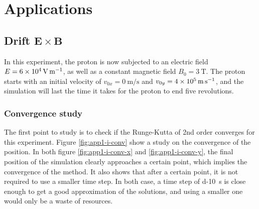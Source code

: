 \documentclass[a4paper,12pt,twoside]{article}
\begin{document}
\section{Applications}
\subsection{Drift $\mathbf{E}\times \mathbf{B}$}
In this experiment, the proton is now subjected to an electric field $E=\SI{6d4}{\volt\per\meter}$, as well as a constant magnetic field $B_0 = \SI{3}{\tesla}$.
The proton starts with an initial velocity of $v_{0x}=\SI{0}{\meter\per\second}$ and $v_{0y}=\SI{4d5}{\meter\per\second}$, and the simulation will last the time it takes for the proton to end five revolutions.

\subsubsection{Convergence study}
The first point to study is to check if the Runge-Kutta of 2nd order converges for this experiment.
Figure \ref{fig:app1-i-conv} show a study on the convergence of the position.
In both figure \ref{fig:app1-i-conv-x} and \ref{fig:app1-i-conv-y}, the final position of the simulation clearly approaches a certain point, which implies the convergence of the method.
It also shows that after a certain point, it is not required to use a smaller time step.
In both case, a time step of \SI{d-10}{\second} is close enough to get a good approximation of the solutions, and using a smaller one would only be a waste of resources.
\end{document}
